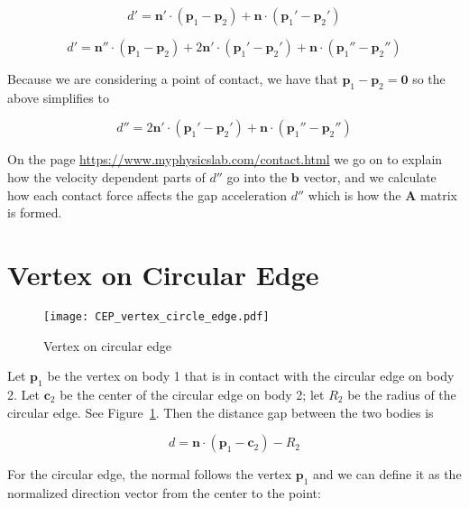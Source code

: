 \documentclass[final]{article}
\begin{document}
\begin{equation}\label{straight_vertex_velocity}
  d' = \mathbf{n}' \cdot (\mathbf{p}_1 - \mathbf{p}_2)
      + \mathbf{n} \cdot (\mathbf{p}_1' - \mathbf{p}_2')
\end{equation}

\begin{equation}\label{straight_vertex_accel_1}
  d' = \mathbf{n}'' \cdot (\mathbf{p}_1 - \mathbf{p}_2)
      + 2 \mathbf{n}' \cdot (\mathbf{p}_1' - \mathbf{p}_2')
      + \mathbf{n} \cdot (\mathbf{p}_1'' - \mathbf{p}_2'')
\end{equation}

Because we are considering a point of contact, we have that $\mathbf{p}_1 - \mathbf{p}_2
= \mathbf{0}$ so the above simplifies to

\begin{equation}\label{straight_vertex_accel_2}
  d'' = 2 \mathbf{n}' \cdot (\mathbf{p}_1' - \mathbf{p}_2')
      + \mathbf{n} \cdot (\mathbf{p}_1'' - \mathbf{p}_2'')
\end{equation}

On the page \url{https://www.myphysicslab.com/contact.html} we go on to explain how the
velocity dependent parts of $d''$ go into the $\mathbf{b}$ vector, and we calculate how
each contact force affects the gap acceleration $d''$ which is how the $\mathbf{A}$
matrix is formed.



\section{Vertex on Circular Edge}

\begin{figure}[ht]
    \centering
    \texttt{[image: CEP\_vertex\_circle\_edge.pdf]}
    \caption{Vertex on circular edge}
    \label{fig:vertex_on_circle}
\end{figure}

Let $\mathbf{p}_1$ be the vertex on body 1 that is in contact with the circular edge on
body 2. Let $\mathbf{c}_2$ be the center of the circular edge on body 2; let $R_2$ be
the radius of the circular edge. See Figure~\ref{fig:vertex_on_circle}. Then the
distance gap between the two bodies is

\[
  d = \mathbf{n} \cdot (\mathbf{p}_1 - \mathbf{c}_2) - R_2
\]

For the circular edge, the normal follows the vertex $\mathbf{p}_1$ and we can define it
as the normalized direction vector from the center to the point:
\end{document}
